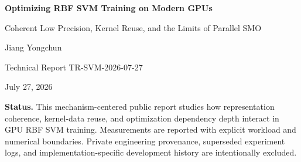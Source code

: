 \documentclass[10pt]{article}
\begin{document}
\hypersetup{pageanchor=false}
\begin{titlepage}
  \centering
  \vspace*{1.0in}
  {\Large\bfseries\color{navy}
    Optimizing RBF SVM Training on Modern GPUs\par}
  \vspace{0.22in}
  {\large Coherent Low Precision, Kernel Reuse, and the Limits of Parallel SMO\par}
  \vspace{0.55in}
  {\large Jiang Yongchun\par}
  \vspace{0.12in}
  {\normalsize Technical Report TR-SVM-2026-07-27\par}
  \vspace{0.08in}
  {\normalsize July 27, 2026\par}

  \vfill
  \begin{minipage}{0.88\textwidth}
    \small
    \noindent\textbf{Status.}
    This mechanism-centered public report studies how representation
    coherence, kernel-data reuse, and optimization dependency depth interact
    in GPU RBF SVM training. Measurements are reported with explicit workload
    and numerical boundaries. Private engineering provenance, superseded
    experiment logs, and implementation-specific development history are
    intentionally excluded.
  \end{minipage}
  \vspace{0.55in}
\end{titlepage}
\hypersetup{pageanchor=true}


\tableofcontents
\clearpage
{}














\end{document}
